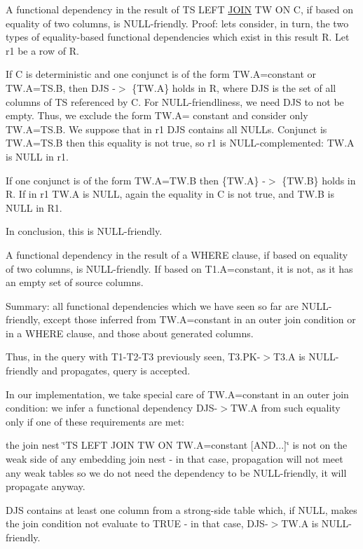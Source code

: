 A functional dependency in the result of TS L\+E\+FT \mbox{\hyperlink{classJOIN}{J\+O\+IN}} TW ON C, if based on equality of two columns, is N\+U\+LL-\/friendly. Proof\+: let\textquotesingle{}s consider, in turn, the two types of equality-\/based functional dependencies which exist in this result R. Let r1 be a row of R.
\begin{DoxyItemize}
\item If C is deterministic and one conjunct is of the form T\+W.\+A=constant or T\+W.\+A=T\+S.\+B, then D\+JS -\/$>$ \{T\+W.\+A\} holds in R, where D\+JS is the set of all columns of TS referenced by C. For N\+U\+LL-\/friendliness, we need D\+JS to not be empty. Thus, we exclude the form T\+W.\+A= constant and consider only T\+W.\+A=T\+S.\+B. We suppose that in r1 D\+JS contains all N\+U\+L\+Ls. Conjunct is T\+W.\+A=T\+S.\+B then this equality is not true, so r1 is N\+U\+LL-\/complemented\+: T\+W.\+A is N\+U\+LL in r1.
\item If one conjunct is of the form T\+W.\+A=T\+W.\+B then \{T\+W.\+A\} -\/$>$ \{T\+W.\+B\} holds in R. If in r1 T\+W.\+A is N\+U\+LL, again the equality in C is not true, and T\+W.\+B is N\+U\+LL in R1.
\item In conclusion, this is N\+U\+LL-\/friendly.
\end{DoxyItemize}

A functional dependency in the result of a W\+H\+E\+RE clause, if based on equality of two columns, is N\+U\+LL-\/friendly. If based on T1.\+A=constant, it is not, as it has an empty set of source columns.

Summary\+: all functional dependencies which we have seen so far are N\+U\+LL-\/friendly, except those inferred from T\+W.\+A=constant in an outer join condition or in a W\+H\+E\+RE clause, and those about generated columns.

Thus, in the query with T1-\/T2-\/T3 previously seen, T3.\+PK-\/$>$T3.\+A is N\+U\+LL-\/friendly and propagates, query is accepted.

In our implementation, we take special care of T\+W.\+A=constant in an outer join condition\+: we infer a functional dependency D\+JS-\/$>$T\+W.\+A from such equality only if one of these requirements are met\+:
\begin{DoxyItemize}
\item the join nest \char`\"{}\+T\+S L\+E\+F\+T J\+O\+I\+N T\+W O\+N T\+W.\+A=constant \mbox{[}\+A\+N\+D...\mbox{]}\char`\"{} is not on the weak side of any embedding join nest -\/ in that case, propagation will not meet any weak tables so we do not need the dependency to be N\+U\+LL-\/friendly, it will propagate anyway.
\item D\+JS contains at least one column from a strong-\/side table which, if N\+U\+LL, makes the join condition not evaluate to T\+R\+UE -\/ in that case, D\+JS-\/$>$T\+W.\+A is N\+U\+LL-\/friendly.
\end{DoxyItemize}

